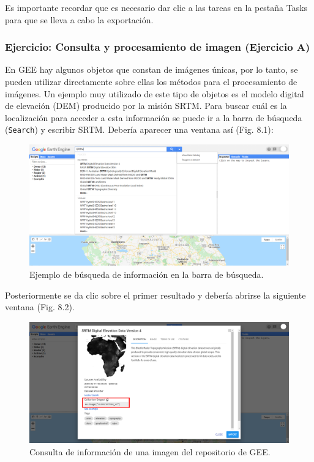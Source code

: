 \documentclass[
  12pt,
  letterpaper,
  twoside]{book}
\begin{document}
Es importante recordar que es necesario dar clic a las tareas en la pestaña Tasks para que se lleva a cabo la exportación.

\hypertarget{ejercicio-consulta-y-procesamiento-de-imagen-ejercicio-a}{%
\subsubsection{Ejercicio: Consulta y procesamiento de imagen (Ejercicio A)}\label{ejercicio-consulta-y-procesamiento-de-imagen-ejercicio-a}}

En GEE hay algunos objetos que constan de imágenes únicas, por lo tanto, se pueden utilizar directamente sobre ellas los métodos para el procesamiento de imágenes. Un ejemplo muy utilizado de este tipo de objetos es el modelo digital de elevación (DEM) producido por la misión SRTM. Para buscar cuál es la localización para acceder a esta información se puede ir a la barra de búsqueda (\texttt{Search}) y escribir SRTM. Debería aparecer una ventana así (Fig. 8.1):

\begin{figure}[btp]

{\centering \includegraphics[width=1\linewidth]{Img/SRTM} 

}

\caption{Ejemplo de búsqueda de información en la barra de búsqueda.}\label{fig:unnamed-chunk-115}
\end{figure}

Posteriormente se da clic sobre el primer resultado y debería abrirse la siguiente ventana (Fig. 8.2).

\begin{figure}[btp]

{\centering \includegraphics[width=1\linewidth]{Img/SRTM_prop} 

}

\caption{Consulta de información de una imagen del repositorio de GEE.}\label{fig:unnamed-chunk-116}
\end{figure}
\end{document}
